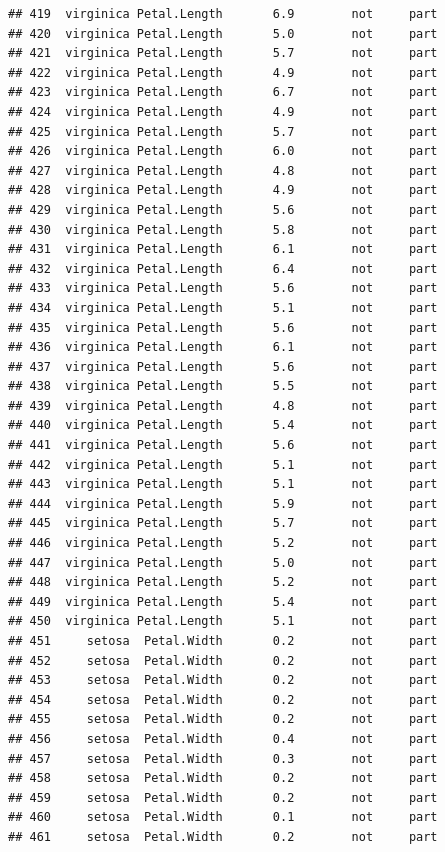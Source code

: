 \documentclass[krantz2]{krantz}\usepackage{knitr}%
\begin{document}
\begin{knitrout}
\begin{kframe}
\begin{verbatim}
## 419  virginica Petal.Length       6.9        not     part
## 420  virginica Petal.Length       5.0        not     part
## 421  virginica Petal.Length       5.7        not     part
## 422  virginica Petal.Length       4.9        not     part
## 423  virginica Petal.Length       6.7        not     part
## 424  virginica Petal.Length       4.9        not     part
## 425  virginica Petal.Length       5.7        not     part
## 426  virginica Petal.Length       6.0        not     part
## 427  virginica Petal.Length       4.8        not     part
## 428  virginica Petal.Length       4.9        not     part
## 429  virginica Petal.Length       5.6        not     part
## 430  virginica Petal.Length       5.8        not     part
## 431  virginica Petal.Length       6.1        not     part
## 432  virginica Petal.Length       6.4        not     part
## 433  virginica Petal.Length       5.6        not     part
## 434  virginica Petal.Length       5.1        not     part
## 435  virginica Petal.Length       5.6        not     part
## 436  virginica Petal.Length       6.1        not     part
## 437  virginica Petal.Length       5.6        not     part
## 438  virginica Petal.Length       5.5        not     part
## 439  virginica Petal.Length       4.8        not     part
## 440  virginica Petal.Length       5.4        not     part
## 441  virginica Petal.Length       5.6        not     part
## 442  virginica Petal.Length       5.1        not     part
## 443  virginica Petal.Length       5.1        not     part
## 444  virginica Petal.Length       5.9        not     part
## 445  virginica Petal.Length       5.7        not     part
## 446  virginica Petal.Length       5.2        not     part
## 447  virginica Petal.Length       5.0        not     part
## 448  virginica Petal.Length       5.2        not     part
## 449  virginica Petal.Length       5.4        not     part
## 450  virginica Petal.Length       5.1        not     part
## 451     setosa  Petal.Width       0.2        not     part
## 452     setosa  Petal.Width       0.2        not     part
## 453     setosa  Petal.Width       0.2        not     part
## 454     setosa  Petal.Width       0.2        not     part
## 455     setosa  Petal.Width       0.2        not     part
## 456     setosa  Petal.Width       0.4        not     part
## 457     setosa  Petal.Width       0.3        not     part
## 458     setosa  Petal.Width       0.2        not     part
## 459     setosa  Petal.Width       0.2        not     part
## 460     setosa  Petal.Width       0.1        not     part
## 461     setosa  Petal.Width       0.2        not     part

\end{verbatim}
\end{kframe}
\end{knitrout}
\end{document}
